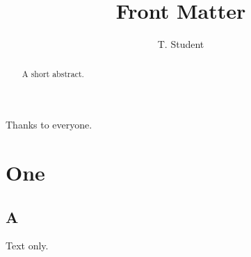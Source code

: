 \documentclass[phd,glossary,strict,12pt,a4paper]{bangor}
\title{Front Matter}
\author{T. Student}
\begin{document}
\maketitle
\begin{acknowledgements}
  Thanks to everyone.
\end{acknowledgements}
\begin{abstract}
  A short abstract.
\end{abstract}
\tables
\printabbrevs
\chapter{One}
\section{A}
Text only.
\end{document}
